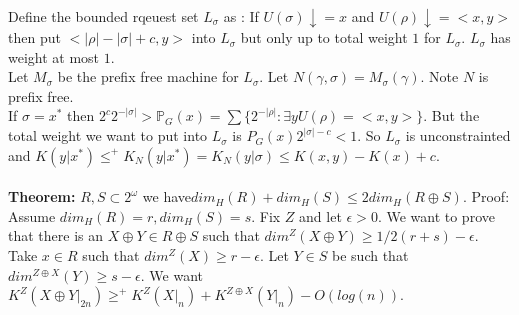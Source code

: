 \documentclass{article}
\newcommand{\bb}{\mathbb}
\begin{document}
  \\Define the bounded rqeuest set $L_\sigma$ as : If $U(\sigma) \downarrow = x$ and $U(\rho) \downarrow = <x,y>$ then put $<|\rho| - |\sigma| + c, y> $ into $L_\sigma$ but only up to total weight $1$ for $L_\sigma$. $L_\sigma$ has weight at most $1$.\\
  Let $M_\sigma$ be the prefix free machine for $L_\sigma$. Let $N(\gamma ,\sigma) = M_\sigma(\gamma)$. Note $N$ is prefix free. \\
  If $\sigma = x^*$ then $2^c2^{-|\sigma|} > \bb P_G(x) = \sum \{2^{-|\rho|}: \exists y U(\rho) = <x,y>\}$. But the total weight we want to put into $L_\sigma$ is $P_G(x) 2^{|\sigma|-c}<1$. So $L_\sigma$ is unconstrainted and $K(y|x^*) \leq^+ K_N(y|x^*) = K_N(y|\sigma) \leq K(x,y) - K(x) + c$.\\\\
  \textbf{Theorem:} $R, S \subset 2^\omega$ we have$dim_H(R) + dim_H(S) \leq 2 dim_H(R \oplus S)$.
  Proof: Assume $dim_H(R) = r, dim_H(S) = s$. Fix $Z$ and let $\epsilon > 0$. We want to prove that there is an $X \oplus Y \in R \oplus S$ such that $dim^Z(X \oplus Y) \geq 1/2 (r+s) - \epsilon $.\\
  Take $x \in R$ such that $dim^Z(X) \geq r-\epsilon $. Let $Y \in S$ be such that $dim^{Z \oplus X}(Y) \geq s-\epsilon$. We want $K^Z(X \oplus Y |_{2n}) \geq^+ K^Z(X|_n) + K^{Z\oplus X}(Y|_n) - O(log(n))$. \newpage 
\end{document}
